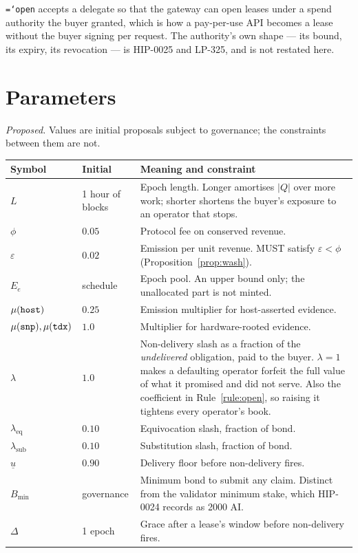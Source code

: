 \documentclass[11pt,a4paper]{article}
\newcommand{\code}[1]{\texttt{\hyphenchar\font=`\-\relax #1}}
\begin{document}
\code{open} accepts a delegate so that the gateway can open leases under a
spend authority the buyer granted, which is how a pay-per-use API becomes a lease
without the buyer signing per request. The authority's own shape --- its bound,
its expiry, its revocation --- is HIP-0025 and LP-325, and is not restated here.

\section{Parameters}

\emph{Proposed.} Values are initial proposals subject to governance; the
constraints between them are not.

\begin{longtable}{@{}llp{}@{}}
\toprule
Symbol & Initial & Meaning and constraint \\
\midrule
\endhead
$L$ & 1 hour of blocks & Epoch length. Longer amortises $|Q|$ over more work;
shorter shortens the buyer's exposure to an operator that stops. \\
$\phi$ & $0.05$ & Protocol fee on conserved revenue. \\
$\varepsilon$ & $0.02$ & Emission per unit revenue. MUST satisfy
$\varepsilon < \phi$ (Proposition~\ref{prop:wash}). \\
$E_e$ & schedule & Epoch pool. An upper bound only; the unallocated part is not
minted. \\
$\mu(\code{host})$ & $0.25$ & Emission multiplier for host-asserted evidence. \\
$\mu(\code{snp}), \mu(\code{tdx})$ & $1.0$ & Multiplier for hardware-rooted
evidence. \\
$\lambda$ & $1.0$ & Non-delivery slash as a fraction of the \emph{undelivered}
obligation, paid to the buyer. $\lambda = 1$ makes a defaulting operator forfeit
the full value of what it promised and did not serve. Also the coefficient in
Rule~\ref{rule:open}, so raising it tightens every operator's book. \\
$\lambda_{\mathrm{eq}}$ & $0.10$ & Equivocation slash, fraction of bond. \\
$\lambda_{\mathrm{sub}}$ & $0.10$ & Substitution slash, fraction of bond. \\
$\underline{u}$ & $0.90$ & Delivery floor before non-delivery fires. \\
$B_{\min}$ & governance & Minimum bond to submit any claim. Distinct from the
validator minimum stake, which HIP-0024 records as 2000 AI. \\
$\Delta$ & 1 epoch & Grace after a lease's window before non-delivery fires. \\
\bottomrule
\end{longtable}
\end{document}
